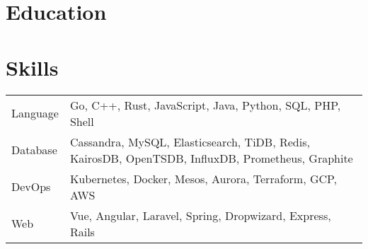 \documentclass[11pt, letterpaper]{simple-cv}
\begin{document}




\section{Education}
{}

\section{Skills}
\begin{flushleft}
	\begin{tabular}{@{}ll@{}}
		Language  & Go, C++, Rust, JavaScript, Java, Python, SQL, PHP, Shell                                                  \\
		Database  & Cassandra, MySQL, Elasticsearch, TiDB, Redis, KairosDB, OpenTSDB, InfluxDB, Prometheus, Graphite \\
		DevOps    & Kubernetes, Docker, Mesos, Aurora, Terraform, GCP, AWS                                                           \\
		Web       & Vue, Angular, Laravel, Spring, Dropwizard, Express, Rails
	\end{tabular}
\end{flushleft}
\end{document}
